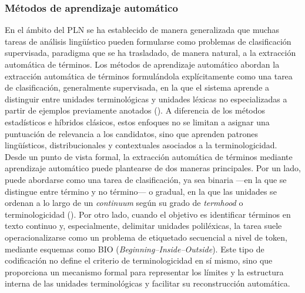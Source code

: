 \subsubsection{Métodos de aprendizaje automático}

En el ámbito del PLN se ha establecido de manera generalizada que muchas tareas de análisis lingüístico pueden formularse como problemas de clasificación supervisada, paradigma que se ha trasladado, de manera natural, a la extracción automática de términos. Los métodos de aprendizaje automático abordan la extracción automática de términos formulándola explícitamente como una tarea de clasificación, generalmente supervisada, en la que el sistema aprende a distinguir entre unidades terminológicas y unidades léxicas no especializadas a partir de ejemplos previamente anotados (\cite{nazar2016distributional,lossio2016biomedical}). A diferencia de los métodos estadísticos e híbridos clásicos, estos enfoques no se limitan a asignar una puntuación de relevancia a los candidatos, sino que aprenden patrones lingüísticos, distribucionales y contextuales asociados a la terminologicidad. Desde un punto de vista formal, la extracción automática de términos mediante aprendizaje automático puede plantearse de dos maneras principales. Por un lado, puede abordarse como una tarea de clasificación, ya sea binaria —en la que se distingue entre término y no término— o gradual, en la que las unidades se ordenan a lo largo de un \textit{continuum} según su grado de \textit{termhood} o terminologicidad (\cite{nazar2011}). Por otro lado, cuando el objetivo es identificar términos en texto continuo y, especialmente, delimitar unidades poliléxicas, la tarea suele operacionalizarse como un problema de etiquetado secuencial a nivel de token, mediante esquemas como BIO (\textit{Beginning–Inside–Outside}). Este tipo de codificación no define el criterio de terminologicidad en sí mismo, sino que proporciona un mecanismo formal para representar los límites y la estructura interna de las unidades terminológicas y facilitar su reconstrucción automática.

